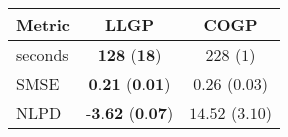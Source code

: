 \begin{tabular}{lcc}\toprule
Metric & LLGP & COGP\\
\midrule
seconds & $\textbf{128}$ ($\textbf{18}$) & $228$ ($1$)\\
SMSE & $\textbf{0.21}$ ($\textbf{0.01}$) & $0.26$ ($0.03$)\\
NLPD & $\textbf{-3.62}$ ($\textbf{0.07}$) & $14.52$ ($3.10$)\\

\bottomrule
\end{tabular}
